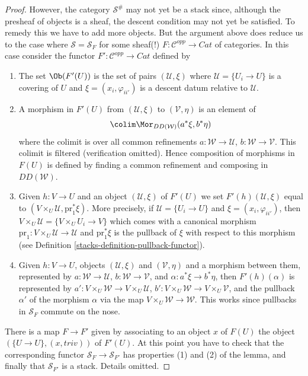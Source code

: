 \begin{proof}
\medskip\noindent
However, the category $\mathcal{S}^\#$ may not yet be a
stack since, although the presheaf of objects is a sheaf,
the descent condition may not yet be satisfied.
To remedy this we have to add more objects. But the argument
above does reduce us to the case where $\mathcal{S} = \mathcal{S}_F$
for some sheaf(!) $F : \mathcal{C}^{opp} \to \textit{Cat}$ of
categories. In this case consider the functor
$F' : \mathcal{C}^{opp} \to \textit{Cat}$ defined by
\begin{enumerate}
\item The set $\Ob(F'(U))$ is the set of pairs
$(\mathcal{U}, \xi)$ where $\mathcal{U} = \{U_i \to U\}$
is a covering of $U$ and $\xi = (x_i, \varphi_{ii'})$ is
a descent datum relative to $\mathcal{U}$.
\item A morphism in $F'(U)$ from
$(\mathcal{U}, \xi)$ to $(\mathcal{V}, \eta)$
is an element of
$$
\colim \Mor_{DD(\mathcal{W})}(a^*\xi, b^*\eta)
$$
where the colimit is over all common refinements
$a : \mathcal{W} \to \mathcal{U}$, $b : \mathcal{W} \to \mathcal{V}$.
This colimit is filtered (verification omitted).
Hence composition of morphisms in $F(U)$ is defined by
finding a common refinement and composing in $DD(\mathcal{W})$.
\item Given $h : V \to U$ and an object
$(\mathcal{U}, \xi)$ of $F'(U)$ we set $F'(h)(\mathcal{U}, \xi)$
equal to $(V \times_U \mathcal{U}, \text{pr}_1^*\xi)$.
More precisely, if $\mathcal{U} = \{U_i \to U\}$
and $\xi = (x_i, \varphi_{ii'})$, then
$V \times_U \mathcal{U} = \{V \times_U U_i \to V\}$
which comes with a canonical morphism
$\text{pr}_1 : V \times_U \mathcal{U} \to \mathcal{U}$ and
$\text{pr}_1^*\xi$ is the pullback of $\xi$ with respect to
this morphism (see Definition \ref{stacks-definition-pullback-functor}).
\item Given $h : V \to U$, objects $(\mathcal{U}, \xi)$
and $(\mathcal{V}, \eta)$ and a morphism between them, represented by
$a : \mathcal{W} \to \mathcal{U}$, $b : \mathcal{W} \to \mathcal{V}$,
and $\alpha : a^*\xi \to b^*\eta$, then $F'(h)(\alpha)$ is
represented by
$a' : V \times_U\mathcal{W} \to V \times_U\mathcal{U}$,
$b' : V \times_U\mathcal{W} \to V \times_U\mathcal{V}$,
and the pullback $\alpha'$ of the morphism $\alpha$ via
the map $V \times_U \mathcal{W} \to \mathcal{W}$. This works
since pullbacks in $\mathcal{S}_F$ commute on the nose.
\end{enumerate}
There is a map $F \to F'$ given by associating to
an object $x$ of $F(U)$ the object $(\{U \to U\}, (x, triv))$ of
$F'(U)$. At this point you have to check that the corresponding
functor $\mathcal{S}_F \to \mathcal{S}_{F'}$ has properties (1)
and (2) of the lemma, and finally that $\mathcal{S}_{F'}$ is
a stack. Details omitted.
\end{proof}

